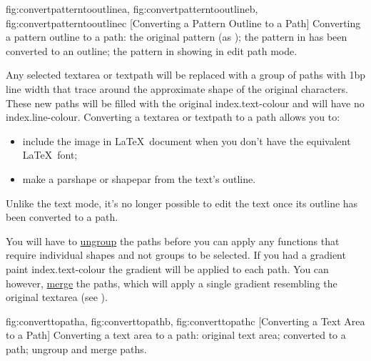 {
  {fig:convertpatterntooutlinea}{}{},
  {fig:convertpatterntooutlineb}{}{},
  {fig:convertpatterntooutlinec}{}{}
}
[Converting a Pattern Outline to a Path]
{Converting a pattern outline to a path:
 the original pattern (as
);
 the pattern
in  has been converted to an
outline;
 the pattern
in  showing in edit path
mode.} 

Any selected \gls{textarea} or \gls{textpath} will be replaced with
a \gls{group} of \glspl{path} with 1\gls{bp} line width that trace
around the approximate shape of the original characters. These new
\glspl{path} will be filled with the original
\gls{index.text-colour} and will have no \gls{index.line-colour}.
Converting a \gls*{textarea} or \gls*{textpath} to a path allows you to:
\begin{itemize}
\item include the image in \LaTeX\ document when you don't have the
equivalent \LaTeX\ font;

\item make a \gls{parshape} or \gls{shapepar}
from the text's outline.
\end{itemize}

\begin{information}
Unlike the text  mode, it's no longer possible to
edit the text once its outline has been converted to a path.
\end{information}

You will have to \hyperref[sec:grouping]{ungroup} the
\glspl*{path} before you can apply any functions that require
individual \glspl{shape} and not \glspl{group} to be selected.  If you
had a gradient paint \gls{index.text-colour} the gradient will be
applied to each \gls*{path}. You can however,
\hyperref[sec:mergepaths]{merge} the \glspl*{path}, which will apply
a single gradient resembling the original \gls*{textarea} (see
).

{
  {fig:converttopatha}{}{},
  {fig:converttopathb}{}{},
  {fig:converttopathc}{}{}
}
[Converting a Text Area to a Path]
{Converting a text area to a path:
 original text area;
 converted to a path;
 ungroup and merge paths.}

